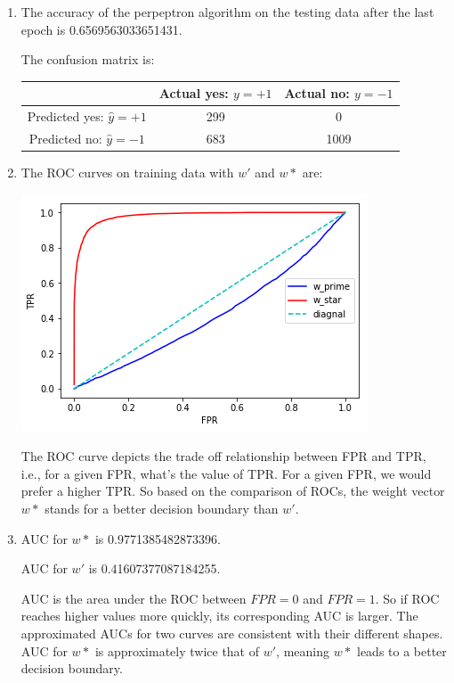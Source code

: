 \documentclass[paper=letter, fontsize=12pt]{article}
\begin{document}
\begin{enumerate}
\begin{enumerate}
	\item 
	The accuracy of the perpeptron algorithm on the testing data after the last epoch is 0.6569563033651431.
	
	The confusion matrix is:
	
	\begin{tabular} {|c|c|c|}
		\hline
		 & Actual yes: $y = +1$ & Actual no: $y = -1$	\\ \hline
		Predicted yes: $\hat{y} = +1$& 299 & 0 \\ \hline
		Predicted no: $\hat{y} = -1$ & 683 & 1009 \\ \hline
	\end{tabular}

	\item 
	The ROC curves on training data with $w'$ and $w*$ are:
	
	\includegraphics[scale=0.5]{p2q1d.png}
	
	The ROC curve depicts the trade off relationship between FPR and TPR, i.e., for a given FPR, what's the value of TPR. For a given FPR, we would prefer a higher TPR. So based on the comparison of ROCs, the weight vector $w*$ stands for a better decision boundary than $w'$.
	
	\item
	AUC for $w*$ is 0.9771385482873396.
	 
	AUC for $w'$ is 0.41607377087184255.
	
	AUC is the area under the ROC between $FPR = 0$ and $FPR = 1$. So if ROC reaches higher values more quickly, its corresponding AUC is larger. The approximated AUCs for two curves are consistent with their different shapes. AUC for $w*$ is approximately twice that of $w'$, meaning $w*$ leads to a better decision boundary.
	 
\end{enumerate}


\end{enumerate}
\end{document}
